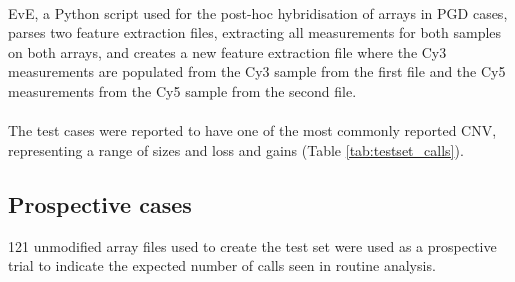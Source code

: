 \paragraph*{}
EvE, a Python script used for the post-hoc hybridisation of arrays in \ac{PGD} cases, parses two feature extraction files, extracting all measurements for both samples on both arrays, and creates a new feature extraction file where the Cy3 measurements are populated from the Cy3 sample from the first file and the Cy5 measurements from the Cy5 sample from the second file.

\paragraph*{}
The test cases were reported to have one of the most commonly reported CNV, representing a range of sizes and loss and gains (Table \ref{tab:testset_calls}).

\begin{table}
\caption{Cases with one of the 9 most common CNV were used to create the test set}
\label{tab:testset_calls}
\end{table}

\subsection{Prospective cases}
121 unmodified array files used to create the test set were used as a prospective trial to indicate the expected number of calls seen in routine analysis.

